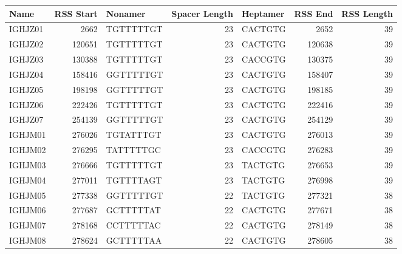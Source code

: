 \begin{tabular}{lrlrlrr}
  \toprule Name & RSS Start & Nonamer & Spacer Length & Heptamer & RSS End & RSS Length \\ 
  \midrule IGHJZ01 & 2662 & TGTTTTTGT & 23 & CACTGTG & 2652 & 39 \\ 
  IGHJZ02 & 120651 & TGTTTTTGT & 23 & CACTGTG & 120638 & 39 \\ 
  IGHJZ03 & 130388 & TGTTTTTGT & 23 & CACCGTG & 130375 & 39 \\ 
  IGHJZ04 & 158416 & GGTTTTTGT & 23 & CACTGTG & 158407 & 39 \\ 
  IGHJZ05 & 198198 & GGTTTTTGT & 23 & CACTGTG & 198185 & 39 \\ 
  IGHJZ06 & 222426 & TGTTTTTGT & 23 & CACTGTG & 222416 & 39 \\ 
  IGHJZ07 & 254139 & GGTTTTTGT & 23 & CACTGTG & 254129 & 39 \\ 
  IGHJM01 & 276026 & TGTATTTGT & 23 & CACTGTG & 276013 & 39 \\ 
  IGHJM02 & 276295 & TATTTTTGC & 23 & CACCGTG & 276283 & 39 \\ 
  IGHJM03 & 276666 & TGTTTTTGT & 23 & TACTGTG & 276653 & 39 \\ 
  IGHJM04 & 277011 & TGTTTTAGT & 23 & TACTGTG & 276998 & 39 \\ 
  IGHJM05 & 277338 & GGTTTTTGT & 22 & TACTGTG & 277321 & 38 \\ 
  IGHJM06 & 277687 & GCTTTTTAT & 22 & CACTGTG & 277671 & 38 \\ 
  IGHJM07 & 278168 & CCTTTTTAC & 22 & CACTGTG & 278149 & 38 \\ 
  IGHJM08 & 278624 & GCTTTTTAA & 22 & CACTGTG & 278605 & 38 \\ 
   \bottomrule \end{tabular}
